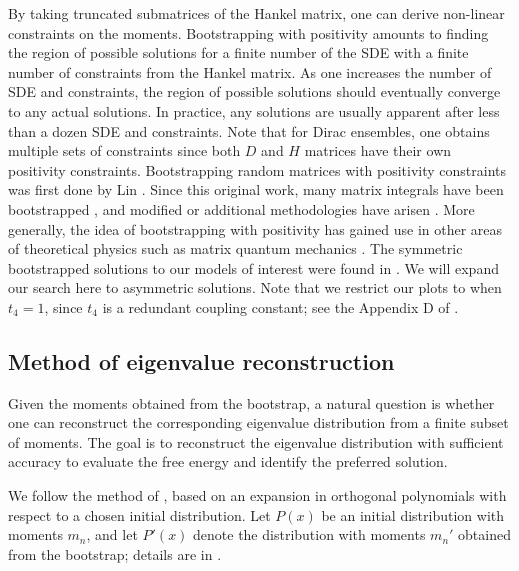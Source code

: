 \documentclass[10pt]{article}
\theoremstyle{plain}
\theoremstyle{definition}
\theoremstyle{plain}
\begin{document}
By taking truncated submatrices of the Hankel matrix, one can derive non-linear constraints on the moments. Bootstrapping with positivity amounts to finding the region of possible solutions for a finite number of the SDE with a finite number of constraints from the Hankel matrix. As one increases the number of SDE and constraints, the region of possible solutions should eventually converge to any actual solutions. In practice, any solutions are usually apparent after less than a dozen SDE and constraints. Note that for Dirac ensembles, one obtains multiple sets of constraints since both $D$ and $H$ matrices have their own positivity constraints. Bootstrapping random matrices with positivity constraints was first done by Lin \cite{lin2020bootstraps}. Since this original work, many matrix integrals have been bootstrapped \cite{li2025analytic,khalkhali2025bootstrapping,hessam2022bootstrapping}, and modified or additional methodologies have arisen \cite{kazakov2022analytic,Kovacik:2025qgj,toriumi2026,maeta2026matrix}. More generally, the idea of bootstrapping with positivity has gained use in other areas of theoretical physics such as matrix quantum mechanics \cite{han2020bootstrapping}. The symmetric bootstrapped solutions to our models of interest were found in \cite{hessam2022bootstrapping}. We will expand our search here to asymmetric solutions. Note that we restrict our plots to when $t_{4}=1$, since $t_{4}$ is a redundant coupling constant; see the Appendix D of \cite{khalkhali2024coloured}.


\subsection{Method of eigenvalue reconstruction}
Given the moments obtained from the bootstrap, a natural question is whether one
can reconstruct the corresponding eigenvalue distribution from a finite subset
of moments. The goal is to reconstruct the eigenvalue distribution with sufficient
accuracy to evaluate the free energy and identify the preferred solution.

We follow the method of \cite{tekel2012constructing}, based on an expansion in orthogonal
polynomials with respect to a chosen initial distribution. Let $P(x)$ be an
initial distribution with moments $m_n$, and let $P'(x)$ denote the distribution
with moments $m_n'$ obtained from the bootstrap; details are in \cite{Kovacik:2025qgj}.
\end{document}
